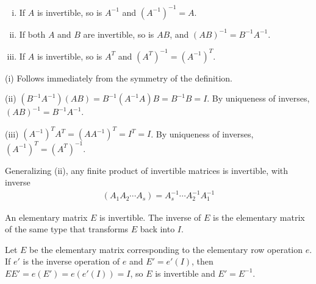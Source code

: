 \documentclass[12pt,letterpaper,reqno]{article}
\numberwithin{equation}{section}
\begin{document}
\begin{thm}[Properties of $A^{-1}$]\label{thm:properties_of_A_inverse} \hspace{10cm}
		\begin{enumerate}[(i)]
		\item If $A$ is invertible, so is $A^{-1}$ and $(A^{-1})^{-1}=A$.
		\item If both $A$ and $B$ are invertible, so is $AB$, and $(AB)^{-1}=B^{-1}A^{-1}$.
		\item If $A$ is invertible, so is $A^T$ and $(A^T)^{-1}=(A^{-1})^T$.
	\end{enumerate}
\end{thm}

\begin{pf} 
(i) Follows immediately from the symmetry of the definition. 

(ii) $(B^{-1}A^{-1})(AB)=B^{-1}(A^{-1}A)B=B^{-1}B=I$. By uniqueness of inverses, $(AB)^{-1}=B^{-1}A^{-1}$.

(iii) $(A^{-1})^TA^T=(AA^{-1})^T=I^T=I$. By uniqueness of inverses, $(A^{-1})^T=(A^T)^{-1}$. 

Generalizing (ii), any finite product of invertible matrices is invertible, with inverse
\begin{align*}
	(A_1A_2\cdots A_s)=A_s^{-1} \cdots A_2^{-1}A_1^{-1}
\end{align*}	
\end{pf}

\begin{thm}\label{thm:elementary_matrices_are_invertible}
An elementary matrix $E$ is invertible. The inverse of $E$ is the elementary matrix of the same type that transforms $E$ back into $I$.
\end{thm}

\begin{pf}
Let $E$ be the elementary matrix corresponding to the elementary row operation $e$. If $e'$ is the inverse operation of $e$ and $E'=e'(I)$, then $EE'=e(E')=e(e'(I))=I$, so $E$ is invertible and $E'=E^{-1}$.	
\end{pf}
\end{document}
